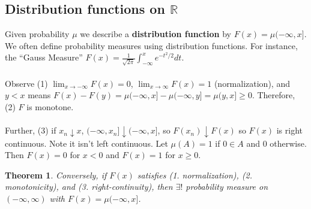 \documentclass[12pt]{article}
\newtheorem{theorem}{Theorem}
\begin{document}
\subsection{Distribution functions on $\mathbb{R}$}
Given probability $\mu$ we describe a {\bf distribution function} by $F(x) = \mu(-\infty, x]$.  We often define probability measures using distribution functions.  For instance, the ``Gauss Measure'' $F(x) = \frac{1}{\sqrt{2 \pi}} \int_{-\infty}^x e^{-t^2/2} dt$.
\\ \\
Observe (1) $\lim_{x \to -\infty} F(x) = 0$, $\lim_{x \to \infty} F(x) = 1$ (normalization), and $y < x$ means $F(x) - F(y) = \mu(-\infty, x] - \mu(-\infty, y] = \mu(y, x] \ge 0$.  Therefore, (2) $F$ is monotone.
\\ \\
Further, (3) if $x_n \downarrow x$, $(-\infty, x_n] \downarrow (-\infty, x]$, so $F(x_n) \downarrow F(x)$ so $F(x)$ is right continuous.  Note it isn't left continuous.  Let $\mu(A) = 1$ if $0 \in A$ and $0$ otherwise.  Then $F(x) = 0$ for $x < 0$ and $F(x) = 1$ for $x \ge 0$.
\begin{theorem}
Conversely, if $F(x)$ satisfies (1. normalization), (2. monotonicity), and (3. right-continuity), then $\exists !$ probability measure on $(-\infty, \infty)$ with $F(x) = \mu(-\infty, x]$.
\end{theorem}
\end{document}
